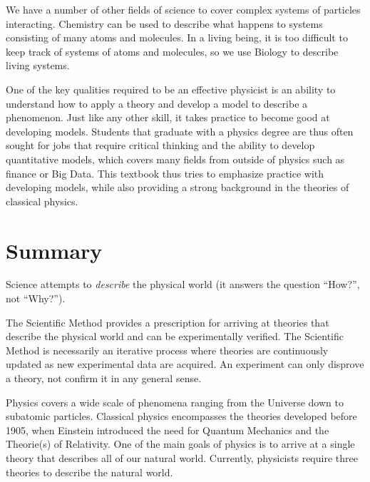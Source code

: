 We have a number of other fields of science to cover complex systems of particles interacting. Chemistry can be used to describe what happens to systems consisting of many atoms and molecules. In a living being, it is too difficult to keep track of systems of atoms and molecules, so we use Biology to describe living systems. 

One of the key qualities required to be an effective physicist is an ability to understand how to apply a theory and develop a model to describe a phenomenon. Just like any other skill, it takes practice to become good at developing models. Students that graduate with a physics degree are thus often sought for jobs that require critical thinking and the ability to develop quantitative models, which covers many fields from outside of physics such as finance or Big Data. This textbook thus tries to emphasize practice with developing models, while also providing a strong background in the theories of classical physics. 

\newpage
\section{Summary}
\vspace{0.5cm}
\begin{chapterSummary}
Science attempts to \textit{describe} the physical world (it answers the question ``How?'', not ``Why?''). 

The Scientific Method provides a prescription for arriving at theories that describe the physical world and can be experimentally verified. The Scientific Method is necessarily an iterative process where theories are continuously updated as new experimental data are acquired. An experiment can only disprove a theory, not confirm it in any general sense.

Physics covers a wide scale of phenomena ranging from the Universe down to subatomic particles. Classical physics encompasses the theories developed before 1905, when Einstein introduced the need for Quantum Mechanics and the Theorie(s) of Relativity. One of the main goals of physics is to arrive at a single theory that describes all of our natural world. Currently, physicists require three theories to describe the natural world.

\end{chapterSummary}

